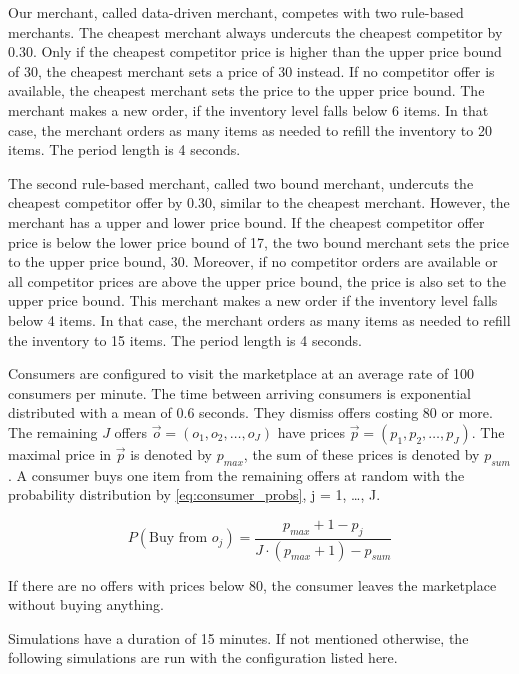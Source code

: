 Our merchant, called data-driven merchant, competes with two rule-based merchants.
The cheapest merchant always undercuts the cheapest competitor by 0.30.
Only if the cheapest competitor price is higher than the upper price bound of 30, the cheapest merchant sets a price of 30 instead.
If no competitor offer is available, the cheapest merchant sets the price to the upper price bound.
The merchant makes a new order, if the inventory level falls below 6 items.
In that case, the merchant orders as many items as needed to refill the inventory to 20 items.
The period length is 4 seconds.

The second rule-based merchant, called two bound merchant, undercuts the cheapest competitor offer by 0.30, similar to the cheapest merchant.
However, the merchant has a upper and lower price bound.
If the cheapest competitor offer price is below the lower price bound of 17, the two bound merchant sets the price to the upper price bound, 30.
Moreover, if no competitor orders are available or all competitor prices are above the upper price bound, the price is also set to the upper price bound.
This merchant makes a new order if the inventory level falls below 4 items.
In that case, the merchant orders as many items as needed to refill the inventory to 15 items.
The period length is 4 seconds.

Consumers are configured to visit the marketplace at an average rate of 100 consumers per minute.
The time between arriving consumers is exponential distributed with a mean of 0.6 seconds.
They dismiss offers costing 80 or more.
The remaining $J$ offers $\vec{o} = (o_1, o_2, \ldots, o_J)$ have prices $\vec{p} = (p_1, p_2, \ldots, p_J)$.
The maximal price in $\vec{p}$ is denoted by $p_{max}$, the sum of these prices is denoted by $p_{sum}$.
A consumer buys one item from the remaining offers at random with the probability distribution by \cref{eq:consumer_probs}, j = 1, \ldots, J.

\begin{equation}
P(\text{Buy from } o_j) = \frac{p_{max} + 1 - p_j}{J \cdot (p_{max} + 1) - p_{sum}}
\label{eq:consumer_probs}
\end{equation}

If there are no offers with prices below 80, the consumer leaves the marketplace without buying anything.

Simulations have a duration of 15 minutes.
If not mentioned otherwise, the following simulations are run with the configuration listed here.


